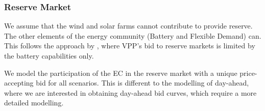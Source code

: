 \subsubsection{Reserve Market}

We assume that the wind and solar farms cannot contribute to provide reserve. The other elements of the energy community (Battery and Flexible Demand) can. This follows the approach by \textcite{Heredia2018}, where VPP's bid to reserve markets is limited by the battery capabilities only.

We model the participation of the EC in the reserve market with a unique price-accepting bid for all scenarios. This is different to the modelling of day-ahead, where we are interested in obtaining day-ahead bid curves, which require a more detailed modelling.


